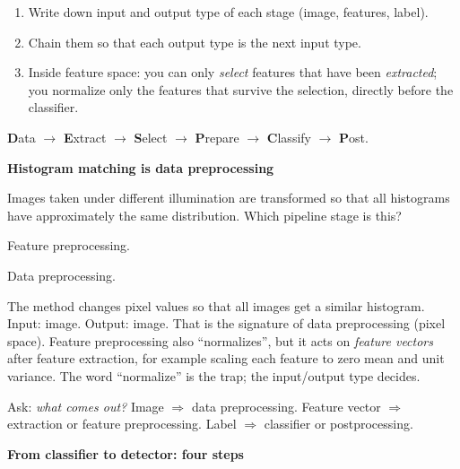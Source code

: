 \documentclass[11pt,a4paper]{article}
\newcommand{\keep}[1]{\par
  \ifdim\dimexpr\pagegoal-\pagetotal\relax<#1\relax\newpage\fi}
\newcommand{\sub}[1]{\keep{6cm}\medskip
  {\sffamily\bfseries\large\color{accent}#1}\par\smallskip}
\begin{document}
\begin{steps}
\begin{enumerate}[leftmargin=*]
  \item Write down input and output type of each stage (image, features, label).
  \item Chain them so that each output type is the next input type.
  \item Inside feature space: you can only \emph{select} features that have
        been \emph{extracted}; you normalize only the features that survive the
        selection, directly before the classifier.
\end{enumerate}
\end{steps}

\begin{hook}
\textbf{D}ata $\to$ \textbf{E}xtract $\to$ \textbf{S}elect $\to$
\textbf{P}repare $\to$ \textbf{C}lassify $\to$ \textbf{P}ost.
\end{hook}

\sub{Histogram matching is data preprocessing}

\begin{question}
Images taken under different illumination are transformed so that all
histograms have approximately the same distribution. Which pipeline stage is
this?
\end{question}

\begin{yours}
Feature preprocessing.
\end{yours}
\begin{correct}
Data preprocessing.
\end{correct}

\begin{why}
The method changes pixel values so that all images get a similar histogram.
Input: image. Output: image. That is the signature of data preprocessing
(pixel space). Feature preprocessing also ``normalizes'', but it acts on
\emph{feature vectors} after feature extraction, for example scaling each
feature to zero mean and unit variance. The word ``normalize'' is the trap; the
input/output type decides.
\end{why}

\begin{hook}
Ask: \emph{what comes out?} Image $\Rightarrow$ data preprocessing. Feature vector
$\Rightarrow$ extraction or feature preprocessing. Label $\Rightarrow$ classifier
or postprocessing.
\end{hook}

\sub{From classifier to detector: four steps}
\end{document}
